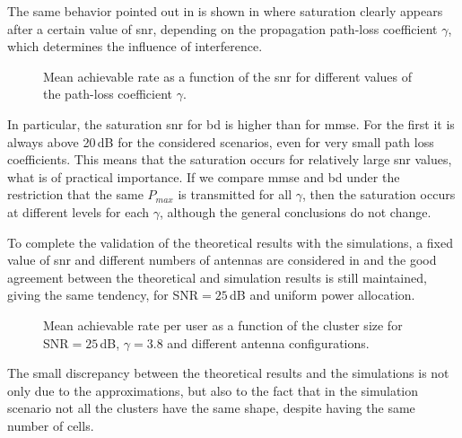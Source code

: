 The same behavior pointed out in \cite{lozano13} is shown in  where saturation clearly appears after a certain value of \gls{snr}, depending on the propagation path-loss coefficient $\gamma$, which determines the influence of interference. 
\begin{figure}[h]
\begin{center}
\begin{small}
\end{small}
\end{center}
\vspace*{-2.7mm}\caption{Mean achievable rate as a function of the \gls{snr} for different values of the path-loss coefficient $\gamma$.}\label{rate_SNR_M7}
\end{figure}
In particular, the saturation \gls{snr} for \gls{bd} is higher than for \gls{mmse}. For the first it is always above 20\,dB for the considered scenarios, even for very small path loss coefficients. This means that the saturation occurs for relatively large \gls{snr} values, what is of practical importance.
If we compare \gls{mmse} and \gls{bd} under the restriction that the same $P_{max}$ is transmitted for all $\gamma$, then the saturation occurs at different levels for each $\gamma$, although the general conclusions do not change.

To complete the validation of the theoretical results with the simulations, a fixed value of \gls{snr} and different numbers of antennas are considered in  and the good agreement between the theoretical and simulation results is still maintained, giving the same tendency, for SNR$=25\,$dB and uniform power allocation.
\begin{figure}[h]
\begin{center}
\begin{small}
\end{small}
\end{center}
\vspace*{-2.7mm}\caption{Mean achievable rate per user as a function of the cluster size for SNR$=25\,$dB,
$\gamma=3.8$ and different antenna configurations.}\label{rateMxMSNR15-25}
\end{figure}
The small discrepancy between the theoretical results and the simulations is not only due to the approximations, but also to the fact that in the simulation scenario not all the clusters have the same shape, despite having the same number of cells.

